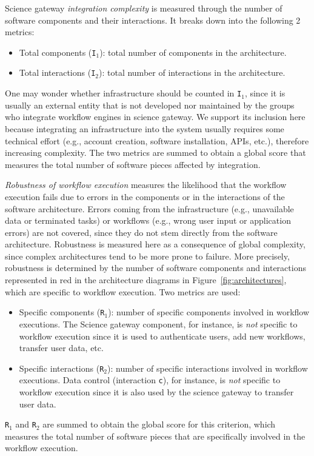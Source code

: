 \documentclass[preprint,3p,twocolumn]{elsarticle}
\begin{document}
Science gateway \emph{integration complexity} is measured through the number of software components and their interactions. It breaks
down into the following 2 metrics:
\begin{itemize}[leftmargin=0cm,itemindent=0.35cm,itemsep=0cm]
\item Total components (\texttt{I$_1$}): total number of components in
  the architecture.
\item Total interactions (\texttt{I$_2$}): total number of
  interactions in the architecture.
\end{itemize}
One may wonder whether infrastructure should be counted in
\texttt{I$_1$}, since it is usually an external entity that is not developed nor maintained by the groups who
integrate workflow engines in science gateway. We support its inclusion here because integrating an
infrastructure into the system usually requires some technical
effort (e.g., account creation, software installation, APIs, etc.), therefore increasing complexity. The two metrics are summed to obtain a
global score that measures the
total number of software pieces affected by integration. 

\emph{Robustness of workflow execution} measures the likelihood that the
workflow execution fails due to errors in the components or in the
interactions of the software architecture. Errors coming
from the infrastructure (e.g., unavailable data or terminated tasks)
or workflows (e.g., wrong user input or application errors) are not
covered, since they do not stem directly from the software
architecture. 
Robustness is measured here as a consequence of global
complexity, since complex architectures tend to be more prone to
failure. More precisely, robustness is determined by the number of
software components and interactions represented in
red in the architecture diagrams in
Figure~\ref{fig:architectures}, which are specific to workflow
execution. Two metrics are used:
\begin{itemize}[leftmargin=0cm,itemindent=0.35cm,itemsep=0cm]
\item Specific components  (\texttt{R$_1$}): number of specific components
involved in workflow executions. The Science
gateway component, for instance, is \emph{not} specific to workflow execution
since it is used to authenticate users, add new workflows, transfer
user data, etc.
\item Specific interactions (\texttt{R$_2$}): number of specific
  interactions involved in workflow executions. Data control
  (interaction \texttt{c}), for instance, is \emph{not} specific to
  workflow execution since it is also used by the science gateway to
  transfer user data. 
\end{itemize}
\texttt{R$_1$} and \texttt{R$_2$} are
summed to obtain the global score for this criterion, which measures
the total number of software pieces that are specifically involved in
the workflow execution.
\end{document}
